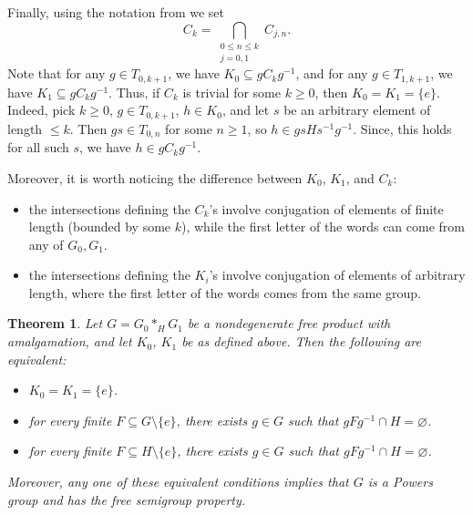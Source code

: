 \documentclass[a4paper]{amsart}
\theoremstyle{plain}
\newtheorem{theorem}{Theorem}
\theoremstyle{definition}
\theoremstyle{remark}
\numberwithin{theorem}{section}
\begin{document}
Finally, using the notation from \cite[(i)~p.~2-3]{HP} we set
\begin{equation}\label{eq:finite-length}
C_k=\bigcap_{\substack{0\leq n\leq k \\ j=0,1}} C_{j,n}.
\end{equation}
Note that for any $g\in T_{0,k+1}$, we have $K_0\subseteq gC_kg^{-1}$,
and for any $g\in T_{1,k+1}$, we have $K_1\subseteq gC_kg^{-1}$.
Thus, if $C_k$ is trivial for some $k\geq 0$, then $K_0=K_1=\{e\}$.
Indeed, pick $k\geq 0$, $g\in T_{0,k+1}$, $h\in K_0$, and let $s$ be an arbitrary element of length $\leq k$.
Then $gs\in T_{0,n}$ for some $n\geq 1$, so $h\in gsHs^{-1}g^{-1}$.
Since, this holds for all such $s$, we have $h\in gC_kg^{-1}$.

Moreover, it is worth noticing the difference between $K_0$, $K_1$, and $C_k$:
\begin{itemize}
\item the intersections defining the $C_k$'s involve conjugation of elements of finite length (bounded by some $k$),
while the first letter of the words can come from any of $G_0,G_1$.
\item the intersections defining the $K_i$'s involve conjugation of elements of arbitrary length,
where the first letter of the words comes from the same group.
\end{itemize}

\begin{theorem}\label{thm:trivial-Ks}
Let $G=G_0*_H G_1$ be a nondegenerate free product with amalgamation, and let $K_0$, $K_1$ be as defined above.
Then the following are equivalent:
\begin{itemize}
\item[(i)] $K_0=K_1=\{e\}$.
\item[(ii)] for every finite $F\subseteq G\setminus\{e\}$, there exists $g\in G$ such that $gFg^{-1}\cap H=\varnothing$.
\item[(iii)] for every finite $F\subseteq H\setminus\{e\}$, there exists $g\in G$ such that $gFg^{-1}\cap H=\varnothing$.
\end{itemize}
Moreover, any one of these equivalent conditions implies that $G$ is a Powers group and has the free semigroup property.
\end{theorem}
\end{document}
